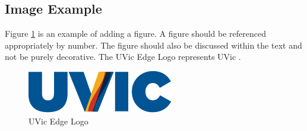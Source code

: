\subsection{Image Example}

Figure \ref{fig:uvic-edge-logo} is an example of adding a figure. A figure should be referenced appropriately by number. The figure should also be discussed within the text and not be purely decorative. The UVic Edge Logo represents UVic \cite{uvicwebsite}.

\vspace{0.25cm}

\begin{figure}[ht]
  \begin{center}
    \includegraphics[scale=0.75]{figures/uvic-edge-logo.png}
    \caption{UVic Edge Logo}
    \label{fig:uvic-edge-logo}
  \end{center}
\end{figure}
